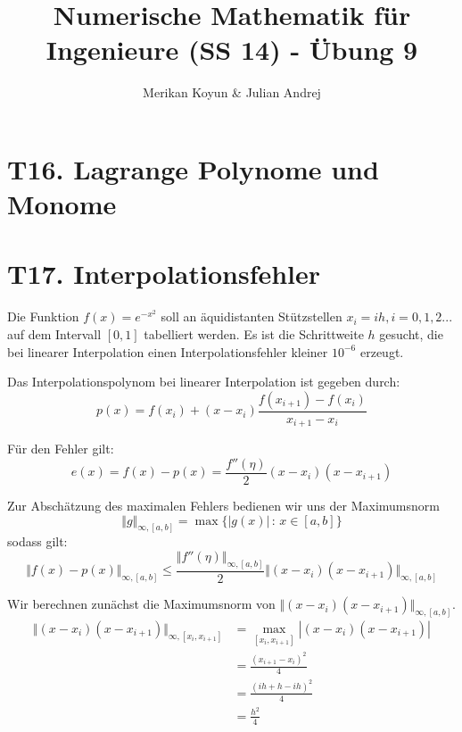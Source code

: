 \documentclass[11pt]{article}
\theoremstyle{plain}
\theoremstyle{definition}
\renewcommand{\a}{\"{a}}
\renewcommand{\u}{\"{u}}
\begin{document}
\title{Numerische Mathematik f\u r Ingenieure (SS 14) - \"{U}bung 9}
\author{Merikan Koyun \& Julian Andrej}
\maketitle

\section*{T16. Lagrange Polynome und Monome}
\section*{T17. Interpolationsfehler}
Die Funktion $f(x)=e^{-x^2}$ soll an \a quidistanten St\u tzstellen $x_i = ih, i=0,1,2...$ auf dem Intervall $[0,1]$ tabelliert werden. Es ist die Schrittweite $h$ gesucht, die bei linearer Interpolation einen Interpolationsfehler kleiner $10^{-6}$ erzeugt.\vspace{0.3cm}

Das Interpolationspolynom bei linearer Interpolation ist gegeben durch:
\begin{equation}
p(x) = f(x_i) + (x-x_i) \frac{f(x_{i+1})-f(x_i)}{x_{i+1}-x_i}
\end{equation}

F\u r den Fehler gilt:
\begin{equation}
e(x) = f(x)-p(x) = \frac{f''(\eta)}{2}(x-x_i)(x-x_{i+1})
\end{equation}

Zur Absch\a tzung des maximalen Fehlers bedienen wir uns der Maximumsnorm
\begin{equation}
\Vert g \Vert_{\infty, [a,b]} = \max\{|g(x)| \, : \, x\in [a,b]\}
\end{equation}
sodass gilt:
\begin{equation}
\Vert f(x)-p(x)\Vert_{\infty, [a,b]} \leq \frac{\Vert f''(\eta) \Vert_{\infty, [a,b]}}{2}\Vert(x-x_i)(x-x_{i+1})\Vert_{\infty, [a,b]}
\end{equation}

Wir berechnen zun\a chst die Maximumsnorm von $\Vert(x-x_i)(x-x_{i+1})\Vert_{\infty, [a,b]}$.
\begin{align}
\Vert(x-x_i)(x-x_{i+1})\Vert_{\infty, [x_i,x_{i+1}]} &= \max_{[x_i,x_{i+1}]} |(x-x_i)(x-x_{i+1})| \\
&= \frac{(x_{i+1}-x_i)^2}{4}\\
&= \frac{(ih+h-ih)^2}{4} \\ 
&= \frac{h^2}{4}
\end{align}
\end{document}
